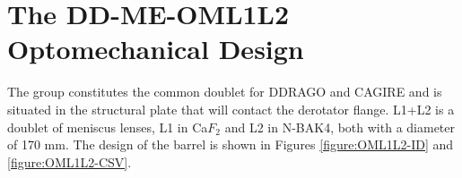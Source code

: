 \documentclass{report}
\newcommand{\CaF}{\ensuremath{\mathrm{CaF_2}}}
\begin{document}

\section{The DD-ME-OML1L2 Optomechanical Design}

The group constitutes the common doublet for DDRAGO and CAGIRE and is situated in the structural plate that will contact the derotator flange.
L1+L2 is a doublet of meniscus lenses, L1 in Ca$F_2$ and L2 in N-BAK4, both with a diameter of 170 mm. The design of the barrel is shown in Figures \ref{figure:OML1L2-ID} and \ref{figure:OML1L2-CSV}.
\end{document}
